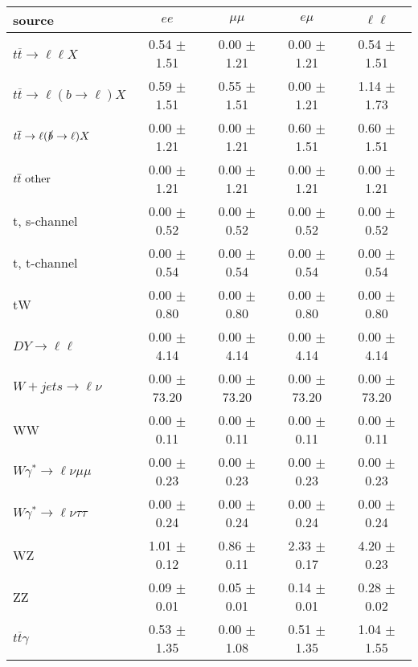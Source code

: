 \begin{tabular}{l|cccc} \hline\hline
source & $ee$ & $\mu\mu$ & $e\mu$ & $\ell\ell $ \\
\hline
$t\overline{t} \rightarrow \ell \ell X$ &  0.54 $\pm$  1.51 &  0.00 $\pm$  1.21 &  0.00 $\pm$  1.21 &  0.54 $\pm$  1.51 \\
$t\overline{t} \rightarrow \ell (b \rightarrow \ell) X$ &  0.59 $\pm$  1.51 &  0.55 $\pm$  1.51 &  0.00 $\pm$  1.21 &  1.14 $\pm$  1.73 \\
$t\overline{t} \rightarrow \ell (\slashed b \rightarrow \ell) X$ &  0.00 $\pm$  1.21 &  0.00 $\pm$  1.21 &  0.60 $\pm$  1.51 &  0.60 $\pm$  1.51 \\
        $t\overline{t}\ \rm{other}$ &  0.00 $\pm$  1.21 &  0.00 $\pm$  1.21 &  0.00 $\pm$  1.21 &  0.00 $\pm$  1.21 \\
\hline
                       t, s-channel &  0.00 $\pm$  0.52 &  0.00 $\pm$  0.52 &  0.00 $\pm$  0.52 &  0.00 $\pm$  0.52 \\
                       t, t-channel &  0.00 $\pm$  0.54 &  0.00 $\pm$  0.54 &  0.00 $\pm$  0.54 &  0.00 $\pm$  0.54 \\
                                 tW &  0.00 $\pm$  0.80 &  0.00 $\pm$  0.80 &  0.00 $\pm$  0.80 &  0.00 $\pm$  0.80 \\
\hline
         $DY \rightarrow \ell \ell$ &  0.00 $\pm$  4.14 &  0.00 $\pm$  4.14 &  0.00 $\pm$  4.14 &  0.00 $\pm$  4.14 \\
      $W+jets \rightarrow \ell \nu$ &  0.00 $\pm$ 73.20 &  0.00 $\pm$ 73.20 &  0.00 $\pm$ 73.20 &  0.00 $\pm$ 73.20 \\
                                 WW &  0.00 $\pm$  0.11 &  0.00 $\pm$  0.11 &  0.00 $\pm$  0.11 &  0.00 $\pm$  0.11 \\
\hline
$W\gamma^{*} \rightarrow \ell \nu \mu\mu$ &  0.00 $\pm$  0.23 &  0.00 $\pm$  0.23 &  0.00 $\pm$  0.23 &  0.00 $\pm$  0.23 \\
$W\gamma^{*} \rightarrow \ell \nu \tau\tau$ &  0.00 $\pm$  0.24 &  0.00 $\pm$  0.24 &  0.00 $\pm$  0.24 &  0.00 $\pm$  0.24 \\
                                 WZ &  1.01 $\pm$  0.12 &  0.86 $\pm$  0.11 &  2.33 $\pm$  0.17 &  4.20 $\pm$  0.23 \\
                                 ZZ &  0.09 $\pm$  0.01 &  0.05 $\pm$  0.01 &  0.14 $\pm$  0.01 &  0.28 $\pm$  0.02 \\
\hline
              $t\overline{t}\gamma$ &  0.53 $\pm$  1.35 &  0.00 $\pm$  1.08 &  0.51 $\pm$  1.35 &  1.04 $\pm$  1.55 \\

\end{tabular}
